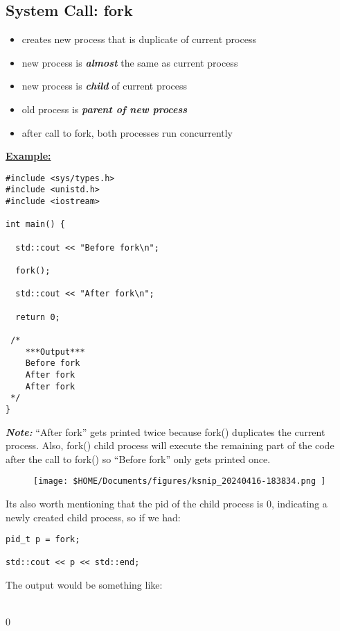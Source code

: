 \documentclass{report}
\begin{document}
\subsection{System Call: fork}
\begin{itemize}
  \item creates new process that is duplicate of current process
  \item new process is \textit{\textbf{almost}} the same as current process
    \bigbreak \noindent
  \item new process is \textit{\textbf{child}} of current process
  \item old process is \textit{\textbf{parent of new process}}
    \bigbreak \noindent
  \item after call to fork, both processes run concurrently
\end{itemize}
\bigbreak \noindent
\textbf{\underline{Example:}}
\begin{verbatim}
#include <sys/types.h>
#include <unistd.h>
#include <iostream>

int main() {

  std::cout << "Before fork\n";
  
  fork();

  std::cout << "After fork\n";

  return 0;
 
 /*
    ***Output***
    Before fork
    After fork
    After fork
 */
}
\end{verbatim}
\textit{\textbf{Note:}} ``After fork'' gets printed twice because fork() duplicates the current process. Also, fork() child process will execute the remaining part of the code after the call to fork() so ``Before fork'' only gets printed once. \vspace{1.5mm}
\begin{figure}[ht]
\centering
\texttt{[image:  \$HOME/Documents/figures/ksnip\_20240416-183834.png ]}
\end{figure}

\noindent Its also worth mentioning that the pid of the child process is 0, indicating a newly created child process, so if we had:
\begin{verbatim}
pid_t p = fork;

std::cout << p << std::end;
\end{verbatim}
The output would be something like: \vspace{1mm}

 \\ 0
\end{document}
